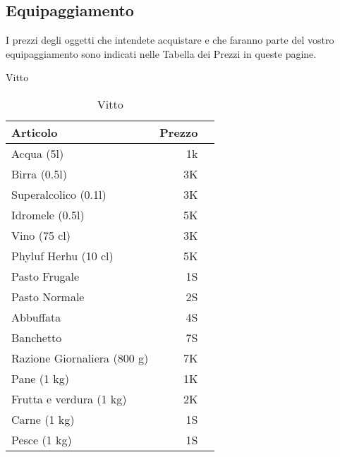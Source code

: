 \subsection{Equipaggiamento}

I prezzi degli oggetti che intendete acquistare e che faranno parte
del vostro equipaggiamento sono indicati nelle Tabella dei Prezzi in queste
pagine.

\begin{table}[p]
  \begin{center}
    {\Large\sc Vitto}\medskip

    \small\begin{tabular}{|l|r|l|}
      \hline
      Articolo& Prezzo \\ \hline
      \hline
      Acqua (5l)& 1k \\ \hline
      Birra (0.5l) & 3K \\ \hline
      Superalcolico (0.1l)& 3K \\ \hline
      Idromele (0.5l)& 5K \\ \hline
      Vino (75 cl)& 3K \\ \hline
      Phyluf Herhu (10 cl)&5K \\ \hline
      Pasto Frugale&1S \\ \hline
      Pasto Normale&2S \\ \hline
      Abbuffata&4S \\ \hline
      Banchetto&7S \\ \hline
      Razione Giornaliera (800 g)&7K \\ \hline
      Pane (1 kg)&1K \\ \hline
      Frutta e verdura (1 kg)&2K \\ \hline
      Carne (1 kg)&1S \\ \hline
      Pesce (1 kg)&1S \\ \hline
    \end{tabular}
    \caption{Vitto}
  \end{center}         
\end{table}

